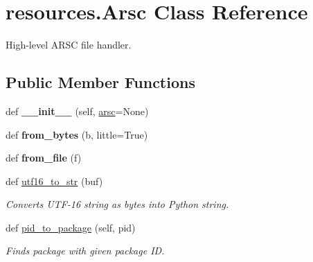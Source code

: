 \hypertarget{classresources_1_1Arsc}{}\section{resources.\+Arsc Class Reference}
\label{classresources_1_1Arsc}


High-\/level A\+R\+SC file handler.  


\subsection*{Public Member Functions}
\begin{DoxyCompactItemize}
\item 
\mbox{\label{classresources_1_1Arsc_acd60d4f6bfba447fe5df1fbb18d613fa}} 
def {\bfseries \+\_\+\+\_\+init\+\_\+\+\_\+} (self, \mbox{\hyperlink{classresources_1_1Arsc_ad0913280798b82e38c02d03dfa41a677}{arsc}}=None)
\item 
\mbox{\label{classresources_1_1Arsc_ab8b8beea0c00e172a00fdd1e775c25f2}} 
def {\bfseries from\+\_\+bytes} (b, little=True)
\item 
\mbox{\label{classresources_1_1Arsc_aac7d208b27baaa084e39cfb8f1c556c8}} 
def {\bfseries from\+\_\+file} (f)
\item 
\mbox{\label{classresources_1_1Arsc_aa4517a4c6233b7f99ec8f2449cee355c}} 
def \mbox{\hyperlink{classresources_1_1Arsc_aa4517a4c6233b7f99ec8f2449cee355c}{utf16\+\_\+to\+\_\+str}} (buf)
\begin{DoxyCompactList}\small\item\em Converts U\+T\+F-\/16 string as bytes into Python string. \end{DoxyCompactList}\item 
\mbox{\label{classresources_1_1Arsc_a034e1114dd5cb5f5a55b2428651be80b}} 
def \mbox{\hyperlink{classresources_1_1Arsc_a034e1114dd5cb5f5a55b2428651be80b}{pid\+\_\+to\+\_\+package}} (self, pid)
\begin{DoxyCompactList}\small\item\em Finds package with given package ID. \end{DoxyCompactList}\item 

\end{DoxyCompactItemize}
